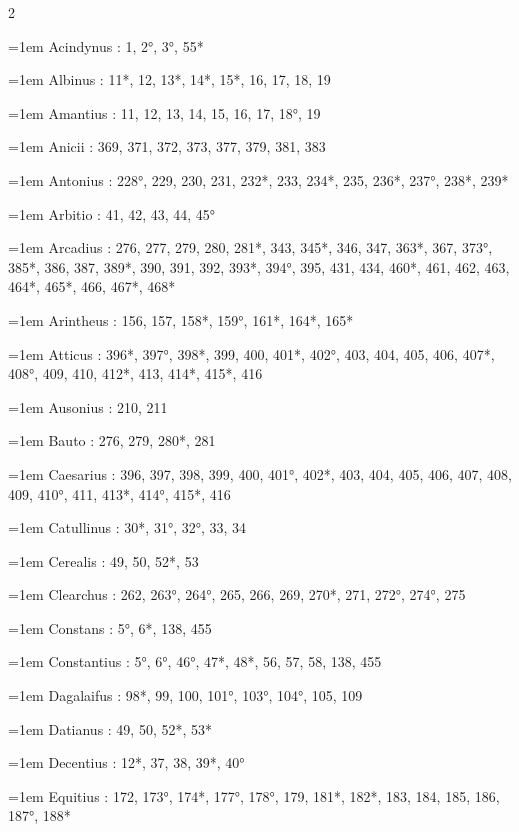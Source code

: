 \begin{multicols}{2}\footnotesize\setlength{\parindent}{0pt}\raggedright
\hangindent=1em Acindynus : 1, 2°, 3°, 55*\par
\hangindent=1em Albinus : 11*, 12, 13*, 14*, 15*, 16, 17, 18, 19\par
\hangindent=1em Amantius : 11, 12, 13, 14, 15, 16, 17, 18°, 19\par
\hangindent=1em Anicii : 369, 371, 372, 373, 377, 379, 381, 383\par
\hangindent=1em Antonius : 228°, 229, 230, 231, 232*, 233, 234*, 235, 236*, 237°, 238*, 239*\par
\hangindent=1em Arbitio : 41, 42, 43, 44, 45°\par
\hangindent=1em Arcadius : 276, 277, 279, 280, 281*, 343, 345*, 346, 347, 363*, 367, 373°, 385*, 386, 387, 389*, 390, 391, 392, 393*, 394°, 395, 431, 434, 460*, 461, 462, 463, 464*, 465*, 466, 467*, 468*\par
\hangindent=1em Arintheus : 156, 157, 158*, 159°, 161*, 164*, 165*\par
\hangindent=1em Atticus : 396*, 397°, 398*, 399, 400, 401*, 402°, 403, 404, 405, 406, 407*, 408°, 409, 410, 412*, 413, 414*, 415*, 416\par
\hangindent=1em Ausonius : 210, 211\par
\hangindent=1em Bauto : 276, 279, 280*, 281\par
\hangindent=1em Caesarius : 396, 397, 398, 399, 400, 401°, 402*, 403, 404, 405, 406, 407, 408, 409, 410°, 411, 413*, 414°, 415*, 416\par
\hangindent=1em Catullinus : 30*, 31°, 32°, 33, 34\par
\hangindent=1em Cerealis : 49, 50, 52*, 53\par
\hangindent=1em Clearchus : 262, 263°, 264°, 265, 266, 269, 270*, 271, 272°, 274°, 275\par
\hangindent=1em Constans : 5°, 6*, 138, 455\par
\hangindent=1em Constantius : 5°, 6°, 46°, 47*, 48*, 56, 57, 58, 138, 455\par
\hangindent=1em Dagalaifus : 98*, 99, 100, 101°, 103°, 104°, 105, 109\par
\hangindent=1em Datianus : 49, 50, 52*, 53*\par
\hangindent=1em Decentius : 12*, 37, 38, 39*, 40°\par
\hangindent=1em Equitius : 172, 173°, 174*, 177°, 178°, 179, 181*, 182*, 183, 184, 185, 186, 187°, 188*\par

\end{multicols}
